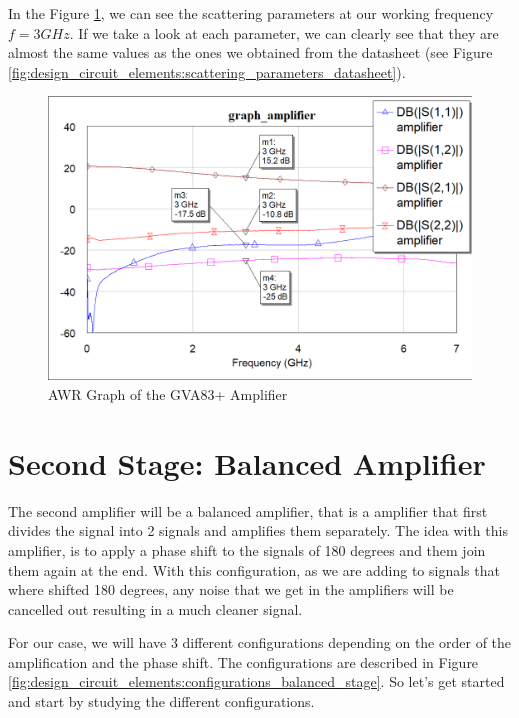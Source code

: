 \documentclass[12pt]{report} %
\begin{document}
In the Figure \ref{fig:design_circuit_elements:graph_amplifier}, we can see the scattering parameters at our working frequency $f = 3 GHz$. If we take a look at each parameter, we can clearly see that they are almost the same values as the ones we obtained from the datasheet (see Figure \ref{fig:design_circuit_elements:scattering_parameters_datasheet}).

\begin{figure}[htbp]
    \centering
    \includegraphics[width=\textwidth]{images/design_circuit_elements/graph_amplifier.png}
    \caption{AWR Graph of the GVA83+ Amplifier}
    \label{fig:design_circuit_elements:graph_amplifier}
\end{figure}

\section{Second Stage: Balanced Amplifier}

The second amplifier will be a balanced amplifier, that is a amplifier that first divides the signal into 2 signals and amplifies them separately. The idea with this amplifier, is to apply a phase shift to the signals of 180 degrees and them join them again at the end. With this configuration, as we are adding to signals that where shifted 180 degrees, any noise that we get in the amplifiers will be cancelled out resulting in a much cleaner signal.

For our case, we will have 3 different configurations depending on the order of the amplification and the phase shift. The configurations are described in Figure \ref{fig:design_circuit_elements:configurations_balanced_stage}. So let's get started and start by studying the different configurations.
\end{document}
